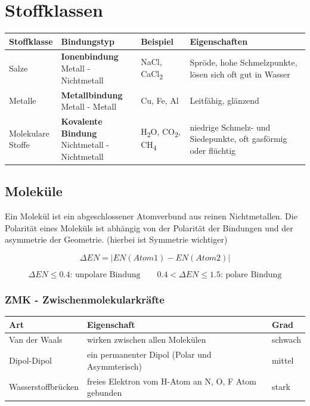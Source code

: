 \section{Stoffklassen}

\small{\begin{tabularx}{\columnwidth}{|l|l|l|X|}
		\hline
		\textbf{Stoffklasse} & \textbf{Bindungstyp} & \textbf{Beispiel} & \textbf{Eigenschaften} \\
		\hline
		Salze & \makecell[l]{\textbf{Ionenbindung} \\ Metall - Nichtmetall} & NaCl, CaCl\textsubscript{2} & Spröde, \newline hohe Schmelzpunkte, lösen sich oft gut in Wasser \\
		\hline
		Metalle & \makecell[l]{\textbf{Metallbindung} \\ Metall - Metall} & Cu, Fe, Al & Leitfähig, glänzend \\
		\hline
		\makecell[l]{Molekulare \\ Stoffe}& \makecell[l]{\textbf{Kovalente Bindung} \\ Nichtmetall - Nichtmetall} & H\textsubscript{2}O, CO\textsubscript{2}, CH\textsubscript{4} & niedrige Schmelz- und Siedepunkte, oft gasförmig oder flüchtig \\
		\hline
\end{tabularx}}

\subsection{Moleküle}
Ein Molekül ist ein abgeschlossener Atomverbund aus reinen Nichtmetallen.
Die Polarität eines Moleküls ist abhängig von der Polarität der Bindungen und der asymmetrie der Geometrie. (hierbei ist Symmetrie wichtiger) 

$$ \boxed{\Delta EN = |EN(Atom 1) - EN(Atom 2)|}$$

$$\boxed{\Delta EN \le 0.4 \text{: unpolare Bindung}} \qquad \boxed{0.4 < \Delta EN \le 1.5 \text{: polare Bindung}} $$

\subsubsection{ZMK - Zwischenmolekularkräfte}

\small{\begin{tabularx}{\columnwidth}{|l|l|X|}
		\hline
		\textbf{Art} & \textbf{Eigenschaft} & \textbf{Grad} \\
		\hline
		Van der Waals & wirken zwischen allen Molekülen &  schwach\\
		\hline
		Dipol-Dipol & ein permanenter Dipol (Polar und Asymmterisch) & mittel \\
		\hline
		Wasserstoffbrücken & freies Elektron vom H-Atom an N, O, F Atom gebunden & stark \\ 
		\hline
\end{tabularx}}

